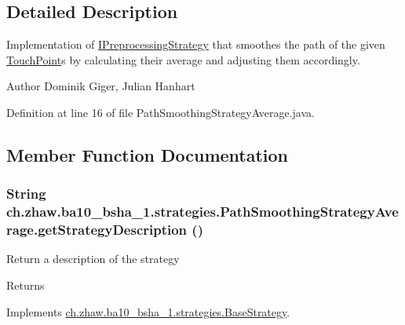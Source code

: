 \subsection{Detailed Description}
Implementation of \hyperlink{interfacech_1_1zhaw_1_1ba10__bsha__1_1_1strategies_1_1IPreprocessingStrategy}{IPreprocessingStrategy} that smoothes the path of the given \hyperlink{classch_1_1zhaw_1_1ba10__bsha__1_1_1TouchPoint}{TouchPoint}s by calculating their average and adjusting them accordingly.

\begin{DoxyAuthor}{Author}
Dominik Giger, Julian Hanhart 
\end{DoxyAuthor}


Definition at line 16 of file PathSmoothingStrategyAverage.java.

\subsection{Member Function Documentation}
\hypertarget{classch_1_1zhaw_1_1ba10__bsha__1_1_1strategies_1_1PathSmoothingStrategyAverage_a153e28cad8f65a4477594ee20598d3cf}{
\subsubsection[{getStrategyDescription}]{\setlength{\rightskip}{0pt plus 5cm}String ch.zhaw.ba10\_\-bsha\_\-1.strategies.PathSmoothingStrategyAverage.getStrategyDescription ()}}
\label{classch_1_1zhaw_1_1ba10__bsha__1_1_1strategies_1_1PathSmoothingStrategyAverage_a153e28cad8f65a4477594ee20598d3cf}
Return a description of the strategy

\begin{DoxyReturn}{Returns}

\end{DoxyReturn}


Implements \hyperlink{classch_1_1zhaw_1_1ba10__bsha__1_1_1strategies_1_1BaseStrategy_a75fdb36932ad701f6375cc1fe718056b}{ch.zhaw.ba10\_\-bsha\_\-1.strategies.BaseStrategy}.

